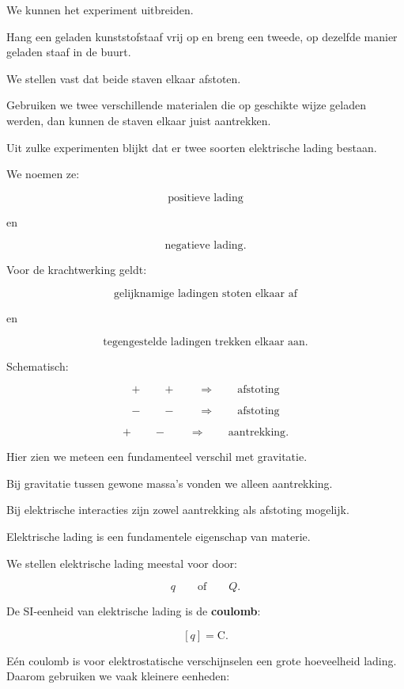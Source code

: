 \documentclass{ximera}
\begin{document}
We kunnen het experiment uitbreiden.

Hang een geladen kunststofstaaf vrij op en breng een tweede, op
dezelfde manier geladen staaf in de buurt.

We stellen vast dat beide staven elkaar afstoten.

Gebruiken we twee verschillende materialen die op geschikte wijze
geladen werden, dan kunnen de staven elkaar juist aantrekken.

Uit zulke experimenten blijkt dat er twee soorten elektrische lading
bestaan.

We noemen ze:

\[
\boxed{\text{positieve lading}}
\]

en

\[
\boxed{\text{negatieve lading}}.
\]


Voor de krachtwerking geldt:

\[
\boxed{
\text{gelijknamige ladingen stoten elkaar af}
}
\]

en

\[
\boxed{
\text{tegengestelde ladingen trekken elkaar aan}.
}
\]


Schematisch:

\[
+\qquad+\qquad\Rightarrow\qquad\text{afstoting}
\]

\[
-\qquad-\qquad\Rightarrow\qquad\text{afstoting}
\]

\[
+\qquad-\qquad\Rightarrow\qquad\text{aantrekking}.
\]


Hier zien we meteen een fundamenteel verschil met gravitatie.

Bij gravitatie tussen gewone massa's vonden we alleen aantrekking.

Bij elektrische interacties zijn zowel aantrekking als afstoting
mogelijk.




Elektrische lading is een fundamentele eigenschap van materie.

We stellen elektrische lading meestal voor door:

\[
q
\qquad\text{of}\qquad
Q.
\]

De SI-eenheid van elektrische lading is de \textbf{coulomb}:

\[
\boxed{
[q]=\mathrm C.
}
\]


Eén coulomb is voor elektrostatische verschijnselen een grote
hoeveelheid lading. Daarom gebruiken we vaak kleinere eenheden:
\end{document}
